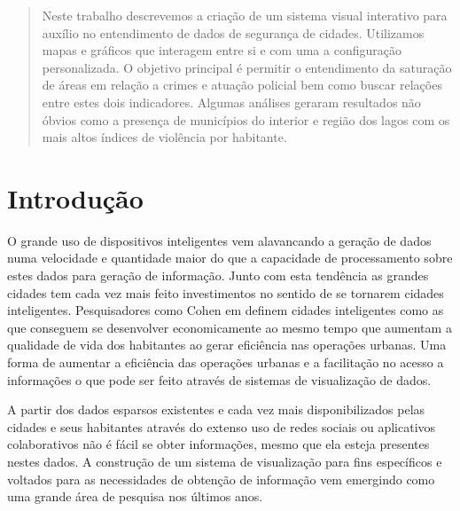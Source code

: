 \documentclass[10pt,conference]{IEEEtran}
\begin{document}
\else
  \author{Sibgrapi paper ID: \jemsid \\ }
\fi


\maketitle

\begin{abstract}
Neste trabalho descrevemos a criação de um sistema visual interativo para auxílio no entendimento de dados de segurança de cidades. Utilizamos mapas e gráficos que interagem entre si e com uma a configuração personalizada. O objetivo principal é permitir o entendimento da saturação de áreas em relação a crimes e atuação policial bem como buscar relações entre estes dois indicadores. Algumas análises geraram resultados não óbvios como a presença de municípios do interior e região dos lagos com os mais altos índices de violência por habitante.
\end{abstract}





\IEEEpeerreviewmaketitle



\section{Introdução}

O grande uso de dispositivos inteligentes vem alavancando a geração de dados numa velocidade e quantidade maior do que a capacidade de processamento sobre estes dados para geração de informação. Junto com esta tendência as grandes cidades tem cada vez mais feito investimentos no sentido de se tornarem cidades inteligentes. Pesquisadores como Cohen em \cite{EXAME.COM2015} definem cidades inteligentes como as que conseguem se desenvolver economicamente ao mesmo tempo que aumentam a qualidade de vida dos habitantes ao gerar eficiência nas operações urbanas. Uma forma de aumentar a eficiência das operações urbanas e a facilitação no acesso a informações o que pode ser feito através de sistemas de visualização de dados.

A partir dos dados esparsos existentes e cada vez mais disponibilizados pelas cidades e seus habitantes através do extenso uso de redes sociais ou aplicativos colaborativos não é fácil se obter informações, mesmo que ela esteja presentes nestes dados. A construção de um sistema de visualização para fins específicos e voltados para as necessidades de obtenção de informação vem emergindo como uma grande área de pesquisa nos últimos anos.
\end{document}
